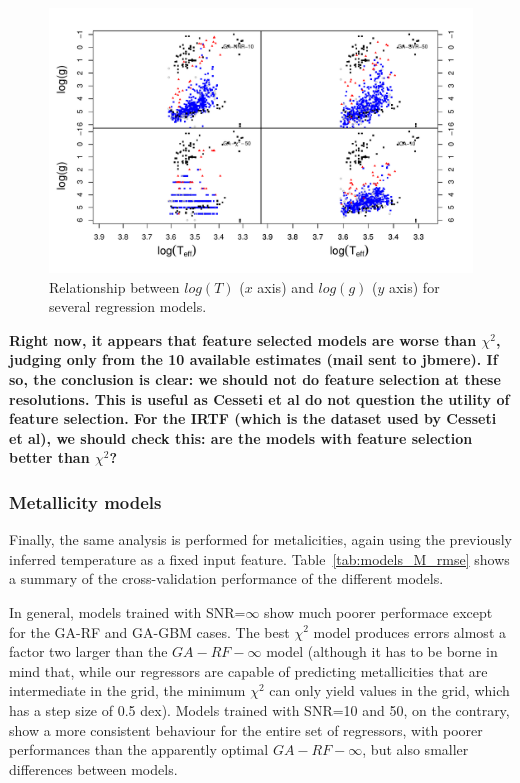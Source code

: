 \begin{figure}
 \begin{center}
 \includegraphics[width=\textwidth]{figs/ipac-teff-logg.pdf}
 \caption{Relationship between $log(T) $ ($x$ axis) 
 and $log(g)$ ($y$ axis) for several regression models.}
 \label{fig:teffvsloggIPAC}
 \end{center}
\end{figure}

{\bf Right now, it appears that feature selected models are worse than
$\chi^2$, judging only from the 10 available estimates (mail sent to
jbmere). If so, the conclusion is clear: we should not do feature
selection at these resolutions. This is useful as Cesseti et al do not
question the utility of feature selection. For the IRTF (which is the
dataset used by Cesseti et al), we should check this: are the models
with feature selection better than $\chi^2$?}

\subsubsection{Metallicity models} 

Finally, the same analysis is performed for metalicities, again using
the previously inferred temperature as a fixed input feature.
Table~\ref{tab:models_M_rmse} shows a summary of the cross-validation
performance of the different models.

In general, models trained with SNR=$\infty$ show much poorer 
performace except for the GA-RF and GA-GBM cases. The best $\chi^2$ 
model produces errors almost a factor two larger than the 
$GA-RF-\infty$ model (although it has to be borne in mind that, while 
our regressors are capable of predicting metallicities that are 
intermediate in the grid, the minimum $\chi^2$ can only yield values 
in the grid, which has a step size of 0.5 dex). Models trained with 
SNR=10 and 50, on the contrary,  show a more consistent behaviour for 
the entire set of regressors, with poorer performances than the 
apparently optimal $GA-RF-\infty$, but also smaller differences between models. 


